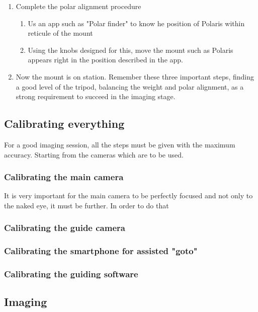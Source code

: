 \documentclass[a4paper,landscape,english,12pt]{article}
\begin{document}
\begin{multicols}{2}
\begin{enumerate}
	\item Complete the polar alignment procedure
	\begin{enumerate}
		\item Us an app such as "Polar finder" to know he position of Polaris within reticule of the mount
		\item Using the knobs designed for this, move the mount such as Polaris appears right in the position described in the app.
		\end{enumerate}
	\item Now the mount is on station. Remember these three important steps, finding a good level of the tripod, balancing the weight and polar alignment, as a strong requirement to succeed in the imaging stage.
\end{enumerate}

\newpage\subsection{Calibrating everything}

For a good imaging session, all the steps must be given with the maximum accuracy. Starting from the cameras which are to be used. 

\subsubsection{Calibrating the main camera }

It is very important for the main camera to be perfectly focused and not only to the naked eye, it must be further. In order to do that

\subsubsection{Calibrating the guide camera }

\subsubsection{Calibrating the smartphone for assisted "goto"}

\subsubsection{Calibrating the guiding software}


\subsection{Imaging}



\end{multicols}
\end{document}

